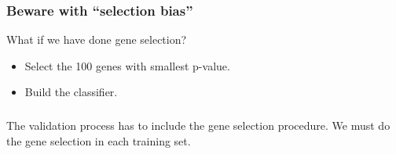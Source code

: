 


\begin{frame}
\frametitle{Beware with ``selection bias''}
What if we have done gene selection?

\begin{itemize}
\item Select the 100 genes with smallest p-value.
\item Build the classifier.
\end{itemize}
\end{frame}


\begin{frame}
\frametitle{}
The validation process has to include the gene selection procedure.
We must do the gene selection in each training set.
\end{frame}






